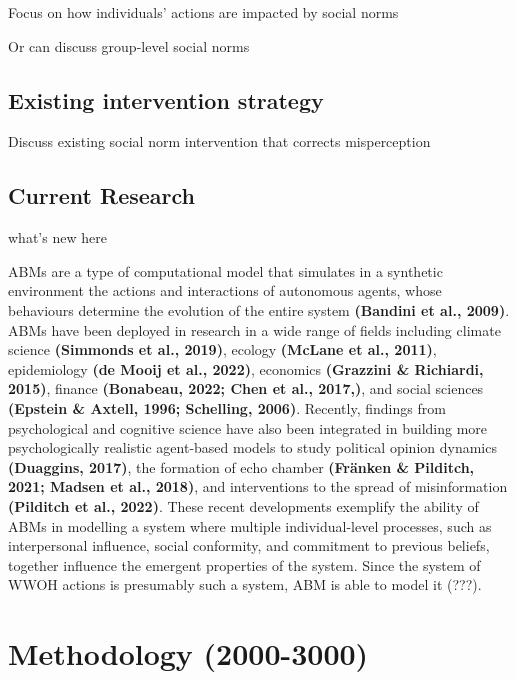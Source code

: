 \documentclass[
  11pt,
]{article}
\begin{document}
Focus on how individuals' actions are impacted by social norms

Or can discuss group-level social norms

\hypertarget{existing-intervention-strategy}{%
\subsection{Existing intervention
strategy}\label{existing-intervention-strategy}}

Discuss existing social norm intervention that corrects misperception

\hypertarget{current-research}{%
\subsection{Current Research}\label{current-research}}

what's new here

ABMs are a type of computational model that simulates in a synthetic
environment the actions and interactions of autonomous agents, whose
behaviours determine the evolution of the entire system \textbf{(Bandini
et al., 2009)}. ABMs have been deployed in research in a wide range of
fields including climate science \textbf{(Simmonds et al., 2019)},
ecology \textbf{(McLane et al., 2011)}, epidemiology \textbf{(de Mooij
et al., 2022)}, economics \textbf{(Grazzini \& Richiardi, 2015)},
finance \textbf{(Bonabeau, 2022; Chen et al., 2017,)}, and social
sciences \textbf{(Epstein \& Axtell, 1996; Schelling, 2006)}. Recently,
findings from psychological and cognitive science have also been
integrated in building more psychologically realistic agent-based models
to study political opinion dynamics \textbf{(Duaggins, 2017)}, the
formation of echo chamber \textbf{(Fränken \& Pilditch, 2021; Madsen et
al., 2018)}, and interventions to the spread of misinformation
\textbf{(Pilditch et al., 2022)}. These recent developments exemplify
the ability of ABMs in modelling a system where multiple
individual-level processes, such as interpersonal influence, social
conformity, and commitment to previous beliefs, together influence the
emergent properties of the system. Since the system of WWOH actions is
presumably such a system, ABM is able to model it (???).

\hypertarget{methodology-2000-3000}{%
\section{Methodology (2000-3000)}\label{methodology-2000-3000}}
\end{document}
